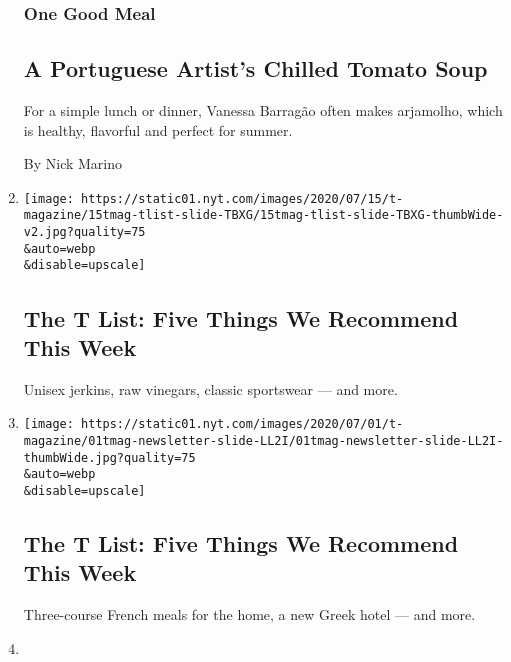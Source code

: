 \begin{enumerate}
  \hypertarget{one-good-meal-5}{%
  \subsubsection{One Good Meal}\label{one-good-meal-5}}

  \hypertarget{a-portuguese-artists-chilled-tomato-soup}{%
  \subsection{A Portuguese Artist's Chilled Tomato
  Soup}\label{a-portuguese-artists-chilled-tomato-soup}}

  For a simple lunch or dinner, Vanessa Barragão often makes arjamolho,
  which is healthy, flavorful and perfect for summer.

  By Nick Marino
\item
  \href{/2020/07/16/t-magazine/margo-price-album-tlist.html}{}

  \texttt{[image: https://static01.nyt.com/images/2020/07/15/t-magazine/15tmag-tlist-slide-TBXG/15tmag-tlist-slide-TBXG-thumbWide-v2.jpg?quality=75\\\&auto=webp\\\&disable=upscale]}

  \hypertarget{the-t-list-five-things-we-recommend-this-week-2}{%
  \subsection{The T List: Five Things We Recommend This
  Week}\label{the-t-list-five-things-we-recommend-this-week-2}}

  Unisex jerkins, raw vinegars, classic sportswear --- and more.
\item
  \href{/2020/07/02/t-magazine/kenzo-vans-tlist.html}{}

  \texttt{[image: https://static01.nyt.com/images/2020/07/01/t-magazine/01tmag-newsletter-slide-LL2I/01tmag-newsletter-slide-LL2I-thumbWide.jpg?quality=75\\\&auto=webp\\\&disable=upscale]}

  \hypertarget{the-t-list-five-things-we-recommend-this-week-3}{%
  \subsection{The T List: Five Things We Recommend This
  Week}\label{the-t-list-five-things-we-recommend-this-week-3}}

  Three-course French meals for the home, a new Greek hotel --- and
  more.
\item
  \href{/2020/06/27/at-home/coronavirus-make-mocktails.html}{}


\end{enumerate}
